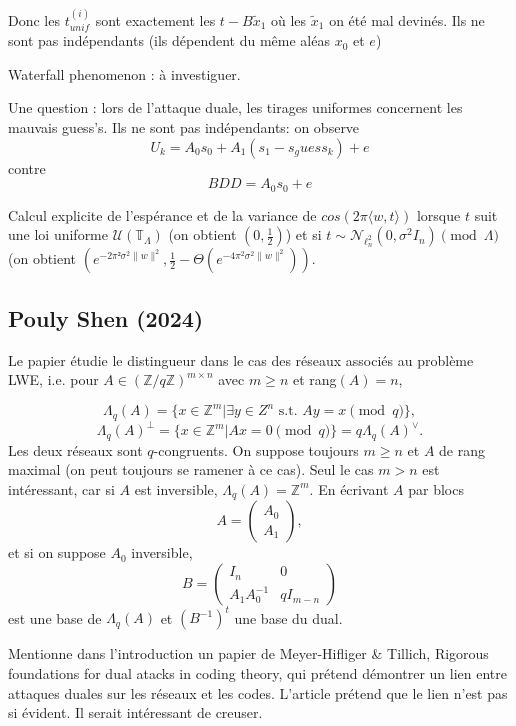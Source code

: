 \documentclass{article}
\begin{document}
Donc les $t^{(i)}_{unif} $ sont exactement les $t-B\tilde x_1$ où les $\tilde x_1$ on été mal devinés. Ils ne sont pas indépendants (ils dépendent du même aléas $x_0$ et $e$)  

Waterfall phenomenon : à investiguer. 

Une question : lors de l'attaque duale, les tirages uniformes concernent les mauvais guess's. Ils ne sont pas indépendants: on observe
$$ U_k = A_0 s_0 + A_1 (s_1 - s_guess_k) + e $$
contre 
$$ BDD = A_0 s_0 + e $$

Calcul explicite de l'espérance et de la variance de $ cos( 2\pi \langle w , t\rangle )$ lorsque $t$ suit une loi uniforme $\mathcal U(\mathbb T_\Lambda)$ (on obtient $(0,\frac{1}{2})$) et si $t\sim \mathcal N_{\ell^2_n}(0 , \sigma^2 I_n) \pmod{\Lambda}$ (on obtient $(e^{-2\pi² \sigma^2 \|w\|^2} , \frac{1}{2} - \Theta(e^{-4\pi^2\sigma^2 \|w\|^2}))$.

\subsection{Pouly Shen (2024)}

Le papier étudie le distingueur dans le cas des réseaux associés au problème LWE, i.e. pour $A\in (\mathbb Z /q\mathbb Z )^{m\times n}$ avec $m\geq n$ et rang$(A)=n$,

$$\Lambda_q(A) = \{x\in \mathbb Z^m | \exists y \in Z^n \text{ s.t. }Ay = x \pmod q \} ,$$
$$\Lambda_q(A)^\perp = \{x\in \mathbb Z^m | Ax = 0 \pmod q \} = q \Lambda_q(A)^\vee.$$
Les deux réseaux sont $q$-congruents. On suppose toujours $m\geq n$ et $A$ de rang maximal (on peut toujours se ramener à ce cas). Seul le cas $m>n$ est intéressant, car si $A$ est inversible, $\Lambda_q(A) = \mathbb Z^m$. En écrivant $A$ par blocs 
$$A =\begin{pmatrix} A_0 \\ A_1\end{pmatrix},$$
et si on suppose $A_0$ inversible, 
$$B=\begin{pmatrix} I_n & 0 \\ A_1A_0^{-1} & qI_{m-n}\end{pmatrix} $$
est une base de $\Lambda_q(A)$ et $(B^{-1})^t$ une base du dual.

Mentionne dans l'introduction un papier de Meyer-Hifliger \& Tillich, Rigorous foundations for dual atacks in coding theory, qui prétend démontrer un lien entre attaques duales sur les réseaux et les codes. L'article prétend que le lien n'est pas si évident. Il serait intéressant de creuser.
\end{document}
